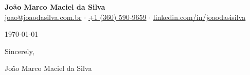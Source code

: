 \documentclass[11pt,letterpaper]{article}
\newcommand{\MYNAME}{João Marco Maciel da Silva}
\begin{document}
\begin{center}
\textbf{\Large{\MYNAME}}\\
\href{mailto:joao@joaodasilva.com.br}{joao@joaodasilva.com.br} $\cdot$
\href{tel:+13605909659}{+1 (360) 590-9659} $\cdot$
\href{https://www.linkedin.com/in/joaodasisilva}{linkedin.com/in/joaodasisilva}
\end{center}

\noindent\today

\vspace{0.3cm}

% 
% 


\vspace{0.3cm}

Sincerely,

\vspace{0.4cm}

\MYNAME
\end{document}
